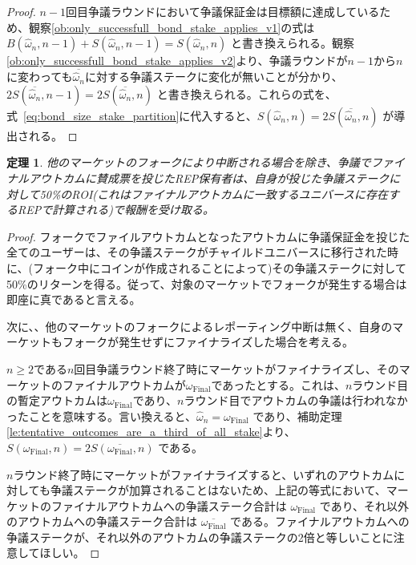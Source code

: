 \documentclass[floatfix,reprint,nofootinbib,amsmath,amssymb,epsfig,pre,floats,letterpaper,groupedaffiliation]{revtex4-1}
\newtheorem{theorem}{定理}
\theoremstyle{definition}
\theoremstyle{definition}
\theoremstyle{definition}
\begin{document}
\begin{appendix}
\begin{proof}
$n-1$回目争議ラウンドにおいて争議保証金は目標額に達成しているため、観察\ref{ob:only_successfull_bond_stake_applies_v1}の式は $B(\hat{\omega}_{n},n-1) + S(\hat{\omega}_{n},n-1) = S(\hat{\omega}_{n},n)$ と書き換えられる。観察\ref{ob:only_successfull_bond_stake_applies_v2}より、争議ラウンドが$n-1$から$n$に変わっても$\overline{\hat{\omega}_{n}}$に対する争議ステークに変化が無いことが分かり、$2S(\overline{\hat{\omega}_{n}},n-1) = 2S(\overline{\hat{\omega}_{n}},n)$ と書き換えられる。これらの式を、式~\ref{eq:bond_size_stake_partition}に代入すると、$S(\hat{\omega}_{n},n) = 2S(\overline{\hat{\omega}_{n}},n)$ が導出される。
\end{proof}

\begin{theorem}\label{th:roi_guarantee}
他のマーケットのフォークにより中断される場合を除き、争議でファイナルアウトカムに賛成票を投じたREP保有者は、自身が投じた争議ステークに対して50\%のROI(これはファイナルアウトカムに一致するユニバースに存在するREPで計算される)で報酬を受け取る。
\end{theorem}

\begin{proof}
フォークでファイルアウトカムとなったアウトカムに争議保証金を投じた全てのユーザーは、その争議ステークがチャイルドユニバースに移行された時に、(フォーク中にコインが作成されることによって)その争議ステークに対して50\%のリターンを得る。従って、対象のマーケットでフォークが発生する場合は即座に真であると言える。

次に、、他のマーケットのフォークによるレポーティング中断は無く、自身のマーケットもフォークが発生せずにファイナライズした場合を考える。

$n \geq 2$である$n$回目争議ラウンド終了時にマーケットがファイナライズし、そのマーケットのファイナルアウトカムが$\omega_{\mathrm{Final}}$であったとする。これは、$n$ラウンド目の暫定アウトカムは$\omega_{\mathrm{Final}}$であり、$n$ラウンド目でアウトカムの争議は行われなかったことを意味する。言い換えると、$\hat{\omega}_{n} = \omega_{\mathrm{Final}}$ であり、補助定理\ref{le:tentative_outcomes_are_a_third_of_all_stake}より、$ S(\omega_{\mathrm{Final}},n) = 2S(\overline{\omega_{\mathrm{Final}}},n)$ である。

$n$ラウンド終了時にマーケットがファイナライズすると、いずれのアウトカムに対しても争議ステークが加算されることはないため、上記の等式において、マーケットのファイナルアウトカムへの争議ステーク合計は $\omega_{\mathrm{Final}}$ であり、それ以外のアウトカムへの争議ステーク合計は $\overline{\omega_{\mathrm{Final}}}$ である。ファイナルアウトカムへの争議ステークが、それ以外のアウトカムの争議ステークの2倍と等しいことに注意してほしい。


\end{proof}
\end{appendix}
\end{document}
